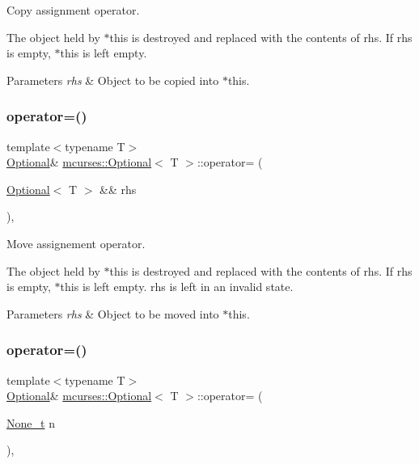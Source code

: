 Copy assignment operator. 

The object held by $\ast$this is destroyed and replaced with the contents of {\ttfamily rhs}. If {\ttfamily rhs} is empty, $\ast$this is left empty. 
\begin{DoxyParams}{Parameters}
{\em rhs} & Object to be copied into $\ast$this. \\
\hline
\end{DoxyParams}
\hypertarget{classmcurses_1_1Optional_aae2fb9089d2d969590c3d666339cb1a4}{}\label{classmcurses_1_1Optional_aae2fb9089d2d969590c3d666339cb1a4} 
\subsubsection{\texorpdfstring{operator=()}{operator=()}\hspace{0.1cm}{\footnotesize\ttfamily [2/7]}}
{\footnotesize\ttfamily template$<$typename T$>$ \\
\hyperlink{classmcurses_1_1Optional}{Optional}\& \hyperlink{classmcurses_1_1Optional}{mcurses\+::\+Optional}$<$ T $>$\+::operator= (\begin{DoxyParamCaption}\item[{\hyperlink{classmcurses_1_1Optional}{Optional}$<$ T $>$ \&\&}]{rhs }\end{DoxyParamCaption})\hspace{0.3cm}{\ttfamily [inline]}, {\ttfamily [noexcept]}}



Move assignement operator. 

The object held by $\ast$this is destroyed and replaced with the contents of {\ttfamily rhs}. If {\ttfamily rhs} is empty, $\ast$this is left empty. rhs is left in an invalid state. 
\begin{DoxyParams}{Parameters}
{\em rhs} & Object to be moved into $\ast$this. \\
\hline
\end{DoxyParams}
\hypertarget{classmcurses_1_1Optional_a5d3515e3b7ce25aa5f5f5d4c08c1b35e}{}\label{classmcurses_1_1Optional_a5d3515e3b7ce25aa5f5f5d4c08c1b35e} 
\subsubsection{\texorpdfstring{operator=()}{operator=()}\hspace{0.1cm}{\footnotesize\ttfamily [3/7]}}
{\footnotesize\ttfamily template$<$typename T$>$ \\
\hyperlink{classmcurses_1_1Optional}{Optional}\& \hyperlink{classmcurses_1_1Optional}{mcurses\+::\+Optional}$<$ T $>$\+::operator= (\begin{DoxyParamCaption}\item[{\hyperlink{classmcurses_1_1None__t}{None\+\_\+t}}]{n }\end{DoxyParamCaption})\hspace{0.3cm}{\ttfamily [inline]}, {\ttfamily [noexcept]}}



